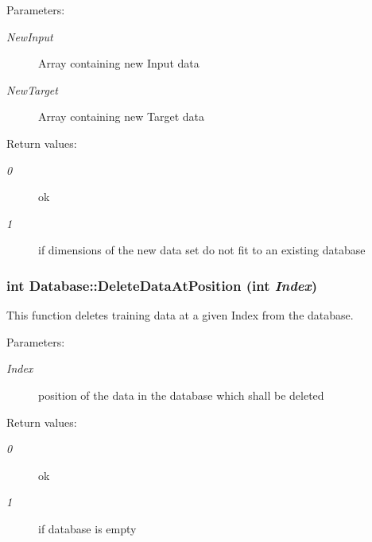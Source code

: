 \begin{Desc}
\item[Parameters: ]\par
\begin{description}
\item[{\em 
New\-Input}]Array containing new Input data \item[{\em 
New\-Target}]Array containing new Target data \end{description}
\end{Desc}
\begin{Desc}
\item[Return values: ]\par
\begin{description}
\item[{\em 
0}]ok \item[{\em 
1}]if dimensions of the new data set do not fit to an existing database \end{description}
\end{Desc}
\subsubsection{\setlength{\rightskip}{0pt plus 5cm}int Database::Delete\-Data\-At\-Position (int {\em Index})}\label{classDatabase_a4}


This function deletes training data at a given Index from the database.

\begin{Desc}
\item[Parameters: ]\par
\begin{description}
\item[{\em 
Index}]position of the data in the database which shall be deleted \end{description}
\end{Desc}
\begin{Desc}
\item[Return values: ]\par
\begin{description}
\item[{\em 
0}]ok \item[{\em 
1}]if database is empty \end{description}
\end{Desc}
